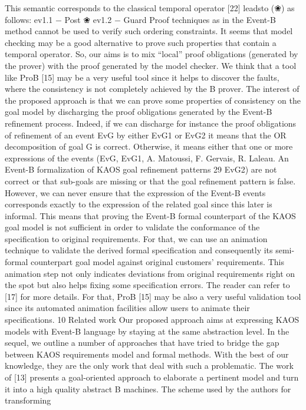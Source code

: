 This semantic corresponds to the classical temporal operator [22] leadsto (❀) as follows:
ev1.1 − Post ❀ ev1.2 − Guard
Proof techniques as in the Event-B method cannot be used to verify such ordering constraints. It seems that model checking may be a good alternative to prove such properties
that contain a temporal operator. So, our aims is to mix “local” proof obligations (generated by the prover) with the proof generated by the model checker. We think that a tool like
ProB [15] may be a very useful tool since it helps to discover the faults, where the consistency
is not completely achieved by the B prover.
The interest of the proposed approach is that we can prove some properties of consistency
on the goal model by discharging the proof obligations generated by the Event-B refinement
process. Indeed, if we can discharge for instance the proof obligations of refinement of an
event EvG by either EvG1 or EvG2 it means that the OR decomposition of goal G is
correct. Otherwise, it means either that one or more expressions of the events (EvG, EvG1,
A. Matoussi, F. Gervais, R. Laleau. An Event-B formalization of KAOS goal refinement patterns 29
EvG2) are not correct or that sub-goals are missing or that the goal refinement pattern is
false. However, we can never ensure that the expression of the Event-B events corresponds
exactly to the expression of the related goal since this later is informal. This means that
proving the Event-B formal counterpart of the KAOS goal model is not sufficient in order
to validate the conformance of the specification to original requirements. For that, we can
use an animation technique to validate the derived formal specification and consequently its
semi-formal counterpart goal model against original customers’ requirements. This animation
step not only indicates deviations from original requirements right on the spot but also helps
fixing some specification errors. The reader can refer to [17] for more details. For that,
ProB [15] may be also a very useful validation tool since its automated animation facilities
allow users to animate their specifications.
10 Related work
Our proposed approach aims at expressing KAOS models with Event-B language by staying
at the same abstraction level. In the sequel, we outline a number of approaches that have
tried to bridge the gap between KAOS requirements model and formal methods. With the
best of our knowledge, they are the only work that deal with such a problematic.
The work of [13] presents a goal-oriented approach to elaborate a pertinent model and turn
it into a high quality abstract B machines. The scheme used by the authors for transforming
